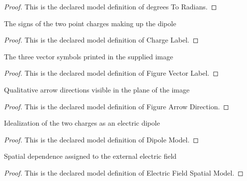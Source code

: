 \begin{proof}
  This is the declared model definition of degrees To Radians.
\end{proof}
\begin{definition}
  \label{def:physics:phyx-mini-0996:phyxminiproblems-problemphyxmini0996-chargelabel}
  The signs of the two point charges making up the dipole
\end{definition}
\begin{proof}
  This is the declared model definition of Charge Label.
\end{proof}
\begin{definition}
  \label{def:physics:phyx-mini-0996:phyxminiproblems-problemphyxmini0996-figurevectorlabel}
  The three vector symbols printed in the supplied image
\end{definition}
\begin{proof}
  This is the declared model definition of Figure Vector Label.
\end{proof}
\begin{definition}
  \label{def:physics:phyx-mini-0996:phyxminiproblems-problemphyxmini0996-figurearrowdirection}
  Qualitative arrow directions visible in the plane of the image
\end{definition}
\begin{proof}
  This is the declared model definition of Figure Arrow Direction.
\end{proof}
\begin{definition}
  \label{def:physics:phyx-mini-0996:phyxminiproblems-problemphyxmini0996-dipolemodel}
  Idealization of the two charges as an electric dipole
\end{definition}
\begin{proof}
  This is the declared model definition of Dipole Model.
\end{proof}
\begin{definition}
  \label{def:physics:phyx-mini-0996:phyxminiproblems-problemphyxmini0996-electricfieldspatialmodel}
  Spatial dependence assigned to the external electric field
\end{definition}
\begin{proof}
  This is the declared model definition of Electric Field Spatial Model.
\end{proof}
